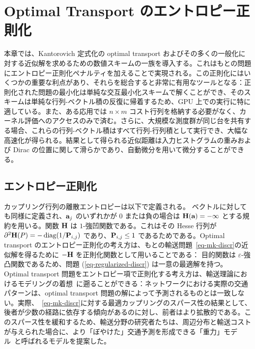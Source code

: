 \chapter{Optimal Transport のエントロピー正則化}
\label{c-entropic}

本章では、Kantorovich 定式化の optimal transport およびその多くの一般化に対する近似解を求めるための数値スキームの一族を導入する。これはもとの問題にエントロピー正則化ペナルティを加えることで実現される。この正則化にはいくつかの重要な利点があり、それらを総合すると非常に有用なツールとなる：正則化された問題の最小化は単純な交互最小化スキームで解くことができ、そのスキームは単純な行列-ベクトル積の反復に帰着するため、GPU 上での実行に特に適している。また、ある応用では $n\times m$ コスト行列を格納する必要がなく、カーネル評価へのアクセスのみで済む。さらに、大規模な測度群が同じ台を共有する場合、これらの行列-ベクトル積はすべて行列-行列積として実行でき、大幅な高速化が得られる。結果として得られる近似距離は入力ヒストグラムの重みおよび Dirac の位置に関して滑らかであり、自動微分を用いて微分することができる。

\section{エントロピー正則化}

カップリング行列の離散エントロピーは以下で定義される。
ベクトルに対しても同様に定義され、$\a_j$ のいずれかが $0$ または負の場合は $\HD(\a) = -\infty$ とする規約を用いる。関数 $\HD$ は $1$-強凹関数である。これはその Hesse 行列が $\partial^2 \HD(P)=-\diag(1/\P_{i,j})$ であり、$\P_{i,j} \leq 1$ であるためである。Optimal transport のエントロピー正則化の考え方は、もとの輸送問題~\eqref{eq-mk-discr}の近似解を得るために $-\HD$ を正則化関数として用いることである：
目的関数は $\varepsilon$-強凸関数であるため、問題 (\ref{eq-regularized-discr}) は一意の最適解を持つ。Optimal transport 問題をエントロピー項で正則化する考え方は、輸送理論におけるモデリングの着想~\citep{wilson1969use}に遡ることができる：ネットワークにおける実際の交通パターンは、optimal transport 問題の解によって予測されるものとは一致しない。実際、~\eqref{eq-mk-discr}に対する最適カップリングのスパース性の結果として、後者が少数の経路に依存する傾向があるのに対し、前者はより拡散的である。このスパース性を緩和するため、輸送分野の研究者たちは、周辺分布と輸送コストが与えられた場合に、より「ぼやけた」交通予測を形成できる「重力」モデル~\citep{erlander1980optimal}と呼ばれるモデルを提案した。


